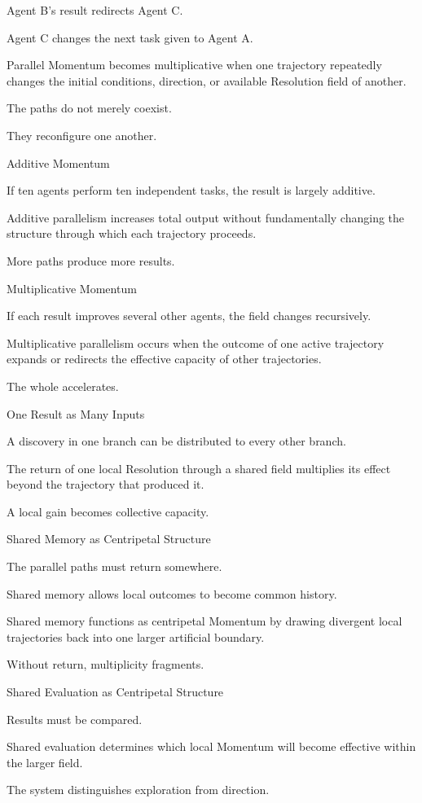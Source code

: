 Agent B’s result redirects Agent C.

Agent C changes the next task given to Agent A.

Parallel Momentum becomes multiplicative when one trajectory repeatedly changes the initial conditions, direction, or available Resolution field of another.

The paths do not merely coexist.

They reconfigure one another.

Additive Momentum

If ten agents perform ten independent tasks, the result is largely additive.

Additive parallelism increases total output without fundamentally changing the structure through which each trajectory proceeds.

More paths produce more results.

Multiplicative Momentum

If each result improves several other agents, the field changes recursively.

Multiplicative parallelism occurs when the outcome of one active trajectory expands or redirects the effective capacity of other trajectories.

The whole accelerates.

One Result as Many Inputs

A discovery in one branch can be distributed to every other branch.

The return of one local Resolution through a shared field multiplies its effect beyond the trajectory that produced it.

A local gain becomes collective capacity.

Shared Memory as Centripetal Structure

The parallel paths must return somewhere.

Shared memory allows local outcomes to become common history.

Shared memory functions as centripetal Momentum by drawing divergent local trajectories back into one larger artificial boundary.

Without return, multiplicity fragments.

Shared Evaluation as Centripetal Structure

Results must be compared.

Shared evaluation determines which local Momentum will become effective within the larger field.

The system distinguishes exploration from direction.

